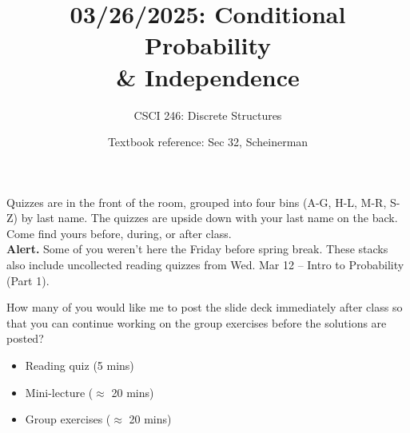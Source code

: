 \documentclass[10pt]{beamer}
\begin{document}




\title{03/26/2025: Conditional Probability \\ \qquad \qquad \qquad \& Independence }
\author{CSCI 246: Discrete Structures}
\date{Textbook reference: Sec 32, Scheinerman}

\begin{frame}
    \titlepage 
\end{frame}


\begin{frame}
\small
\begin{mygreenbox}[title=Graded Quiz Pickup]
Quizzes are in the front of the room, grouped into four bins (A-G, H-L, M-R, S-Z) by last name. The quizzes are upside down with your last name on the back. Come find yours before, during, or after class. \\ %

\textbf{Alert.} Some of you weren't here the Friday before spring break. These stacks also include uncollected reading quizzes from Wed. Mar 12 -- Intro to Probability (Part 1). 
\end{mygreenbox} 
\vfill 

\begin{myyellowbox}[title=\text{Poll}]
How many of you would like me to post the slide deck immediately after class so that you can continue working on the group exercises before the solutions are posted?
\end{myyellowbox}

\vfill 


\begin{myredbox}[title=Today's Agenda]
\begin{itemize}
	\item Reading quiz (5 mins)
	\item Mini-lecture ($\approx$ 20 mins)
	\item Group exercises ($\approx$ 20 mins)
\end{itemize}


\end{myredbox}
\vfill 

\end{frame}
\end{document}
